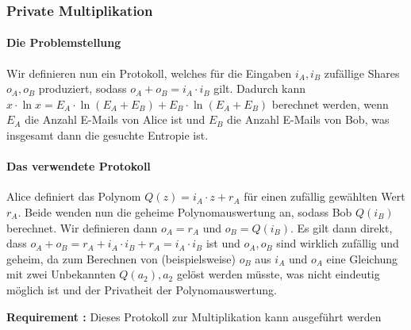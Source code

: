 \documentclass{article}
\newcounter{requirementscount}{}
\newcommand{\requirement}[1] {
        \addtocounter{requirementscount}{1}
        {\bf Requirement \therequirementscount:} #1\\
    }
\begin{document}
\subsubsection{Private Multiplikation}
\paragraph{Die Problemstellung}
Wir definieren nun ein Protokoll, welches f\"ur die Eingaben \(i_A, i_B\) 
zuf\"allige Shares \(o_A, o_B\) produziert, sodass \(o_A + o_B = i_A \cdot i_B\)
gilt. Dadurch kann
\(x \cdot \ln x = E_A \cdot \ln (E_A + E_B) + E_B \cdot \ln (E_A + E_B)\) berechnet
werden, wenn \(E_A\) die Anzahl E-Mails von Alice ist und \(E_B\) die Anzahl E-Mails
von Bob, was insgesamt dann die gesuchte Entropie ist.

\paragraph{Das verwendete Protokoll}
Alice definiert das Polynom \(Q(z) = i_A \cdot z + r_A\) f\"ur einen
zuf\"allig gew\"ahlten Wert \(r_A\). Beide wenden nun die geheime 
Polynomauswertung an, sodass Bob \(Q(i_B)\) berechnet. Wir definieren
dann \(o_A = r_A\) und \(o_B = Q(i_B)\). Es gilt dann direkt, dass
\(o_A + o_B = r_A + i_A \cdot i_B + r_A = i_A \cdot i_B\) ist und
\(o_A, o_B\) sind wirklich zuf\"allig und geheim, da zum Berechnen von 
(beispielsweise) \(o_B\) aus \(i_A\) und \(o_A\) eine Gleichung
mit zwei Unbekannten \(Q(a_2), a_2\) gel\"ost werden m\"usste, was
nicht eindeutig m\"oglich ist und der Privatheit der Polynomauswertung.\\
\requirement{Dieses Protokoll zur Multiplikation kann ausgef\"uhrt werden}
\end{document}
